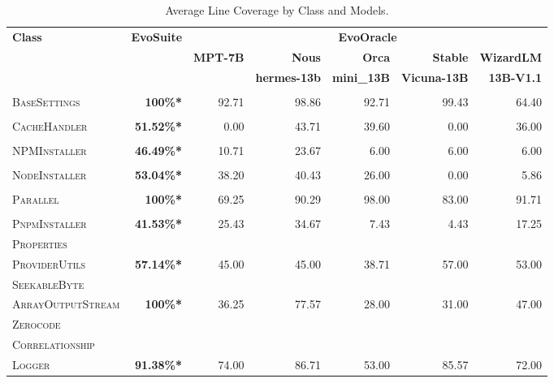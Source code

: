 \begin{table}[H]
\centering

\begin{tabular}{| l | r | r | r | r | r | r |}
\hline
\multirow{2}{*}{\textbf{Class}} & \multirow{2}{*}{\textbf{EvoSuite}} & \multicolumn{5}{c|}{\textbf{EvoOracle}} \\ %
\cline{3-7} %
 &  & \textbf{MPT-7B} & \textbf{Nous} & \textbf{Orca} & \textbf{Stable} & \textbf{WizardLM} \\
 &  &  & \textbf{hermes-13b} & \textbf{mini\_13B} & \textbf{Vicuna-13B} & \textbf{13B-V1.1} \\
\hline
\scriptsize\textsc{} &  &  &  &  &  &  \\
\scriptsize\textsc{BaseSettings} & \textbf{100\%*} & 92.71 & 98.86 & 92.71 & 99.43 & 64.40 \\
\hline
\scriptsize\textsc{} &  &  &  &  &  &  \\
\scriptsize\textsc{CacheHandler} & \textbf{51.52\%*} & 0.00 & 43.71 & 39.60 & 0.00 & 36.00 \\
\hline
\scriptsize\textsc{} &  &  &  &  &  &  \\
\scriptsize\textsc{NPMInstaller} & \textbf{46.49\%*} & 10.71 & 23.67 & 6.00 & 6.00 & 6.00 \\
\hline
\scriptsize\textsc{} &  &  &  &  &  &  \\
\scriptsize\textsc{NodeInstaller} & \textbf{53.04\%*} & 38.20 & 40.43 & 26.00 & 0.00 & 5.86 \\
\hline
\scriptsize\textsc{} &  &  &  &  &  &  \\
\scriptsize\textsc{Parallel} & \textbf{100\%*} & 69.25 & 90.29 & 98.00 & 83.00 & 91.71 \\
\hline
\scriptsize\textsc{} &  &  &  &  &  &  \\
\scriptsize\textsc{PnpmInstaller} & \textbf{41.53\%*} & 25.43 & 34.67 & 7.43 & 4.43 & 17.25 \\
\hline
\scriptsize\textsc{Properties} &  &  &  &  &  &  \\
\scriptsize\textsc{ProviderUtils} & \textbf{57.14\%*} & 45.00 & 45.00 & 38.71 & 57.00 & 53.00 \\
\hline
\scriptsize\textsc{SeekableByte} &  &  &  &  &  &  \\
\scriptsize\textsc{ArrayOutputStream} & \textbf{100\%*} & 36.25 & 77.57 & 28.00 & 31.00 & 47.00 \\
\hline
\scriptsize\textsc{Zerocode} &  &  &  &  &  &  \\
\scriptsize\textsc{Correlationship} &  &  &  &  &  &  \\
\scriptsize\textsc{Logger} & \textbf{91.38\%*} & 74.00 & 86.71 & 53.00 & 85.57 & 72.00 \\
\hline

\end{tabular}
\caption{Average Line Coverage by Class and Models.\protect\footnotemark}
\label{tab:line_coverage}
\end{table}


